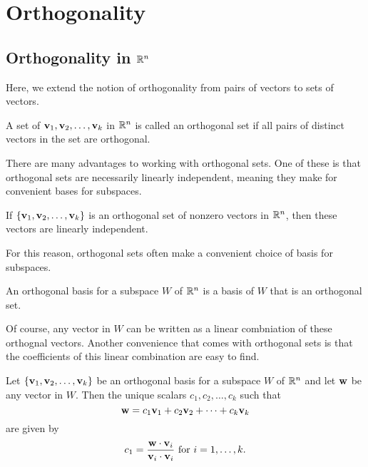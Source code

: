 \documentclass[../m073main.tex]{subfiles}
\begin{document}
\chapter{Orthogonality}

\section{Orthogonality in $\mathbb{R}^n$}
Here, we extend the notion of orthogonality from pairs of vectors to sets of vectors.

\begin{definition}
	A set of $\mathbf{v}_1, \mathbf{v}_2, \ldots, \mathbf{v}_k$ in $\mathbb{R}^n$ is called an orthogonal set if all pairs of distinct vectors in the set are orthogonal. 
\end{definition}

There are many advantages to working with orthogonal sets.
One of these is that orthogonal sets are necessarily linearly independent, meaning they make for convenient bases for subspaces.

\begin{theorem}
	If $\{\mathbf{v}_1, \mathbf{v}_2, \ldots, \mathbf{v}_k\}$ is an orthogonal set of nonzero vectors in $\mathbb{R}^n$, then these vectors are linearly independent.
\end{theorem}

For this reason, orthogonal sets often make a convenient choice of basis for subspaces.

\begin{definition}
	An orthogonal basis for a subspace $W$ of $\mathbb{R}^n$ is a basis of $W$ that is an orthogonal set.
\end{definition}

Of course, any vector in $W$ can be written as a linear combniation of these orthognal vectors.
Another convenience that comes with orthogonal sets is that the coefficients of this linear combination are easy to find.

\begin{theorem}
	Let $\{\mathbf{v}_1, \mathbf{v}_2, \ldots, \mathbf{v}_k\}$ be an orthogonal basis for a subspace $W$ of $\mathbb{R}^n$ and let $\mathbf{w}$ be any vector in $W$.
	Then the unique scalars $c_1, c_2, \ldots, c_k$ such that
	\[ \mathbf{w} = c_1 \mathbf{v}_1 + c_2 \mathbf{v}_2 + \cdots + c_k \mathbf{v}_k \]
	are given by
	\[ c_1 = \frac{\mathbf{w} \cdot \mathbf{v}_i}{\mathbf{v}_i \cdot \mathbf{v}_i} \text{ for } i = 1, \ldots, k. \]
\end{theorem}
\end{document}
